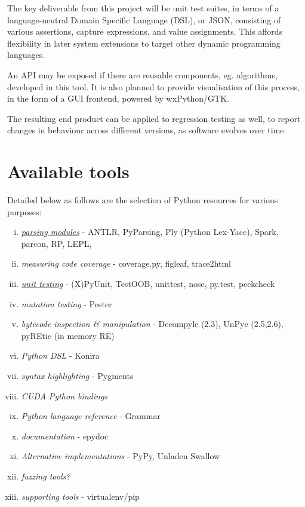 \documentclass{icldt}
\numberwithin{equation}{section}       %
\begin{document}
The key deliverable from this project will be unit test suites, in terms of a language-neutral Domain Specific Language (DSL), or JSON, consisting of various assertions, capture expressions, and value assignments. This affords flexibility in later system extensions to target other dynamic programming languages.

An API may be exposed if there are reusable components, eg. algorithms, developed in this tool. It is also planned to provide visualisation of this process, in the form of a GUI frontend, powered by wxPython/GTK.

The resulting end product can be applied to regression testing as well, to report changes in behaviour across different versions, as software evolves over time.

\section*{Available tools}
Detailed below as follows are the selection of Python resources for various purposes:
\begin{enumerate}[i.]
	\item \emph{\href{http://wiki.python.org/moin/LanguageParsing}{parsing modules}} - ANTLR, PyParsing, Ply (Python Lex-Yacc), Spark, parcon, RP, LEPL, 
	\item \emph{measuring code coverage} - coverage.py, figleaf, trace2html
	\item \emph{\href{http://wiki.python.org/moin/PythonTestingToolsTaxonomy}{unit testing}} - (X)PyUnit, TestOOB, unittest, nose, py.test, peckcheck
	\item \emph{mutation testing} - Pester
	\item \emph{bytecode inspection \& manipulation} - Decompyle (2.3), UnPyc (2.5,2.6), pyREtic (in memory RE)
	\item \emph{Python DSL} - Konira
	\item \emph{syntax highlighting} - Pygments
	\item \emph{CUDA Python bindings}
	\item \emph{Python language reference} - Grammar
	\item \emph{documentation} - epydoc
	\item \emph{Alternative implementations} - PyPy, Unladen Swallow
	\item \emph{fuzzing tools?}
	\item \emph{supporting tools} - virtualenv/pip
\end{enumerate}
\end{document}
